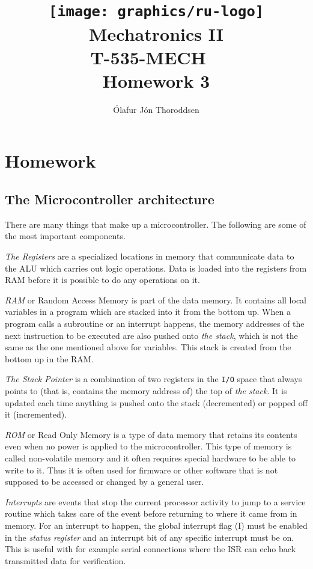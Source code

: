 \documentclass[11pt,a4paper,titlepage]{article}
\author{Ólafur Jón Thoroddsen}  %
\title{\texttt{[image: graphics/ru-logo]}\\\vspace{10mm}
	Mechatronics II\\T-535-MECH \ \\Homework 3}  %
\begin{document}
	\maketitle
	
\section{Homework}

\subsection{The Microcontroller architecture}
\noindent There are many things that make up a microcontroller. The following are some of the most important components.

\textit{The Registers} are a specialized locations in memory that communicate data to the ALU which carries out logic operations. Data is loaded into the registers from RAM before it is possible to do any operations on it.

\textit{RAM} or Random Access Memory is part of the data memory. It contains all local variables in a program which are stacked into it from the bottom up. When a program calls a subroutine or an interrupt happens, the memory addresses of the next instruction to be executed are also pushed onto \textit{the stack}, which is not the same as the one mentioned above for variables. This stack is created from the bottom up in the RAM.

\textit{The Stack Pointer} is a combination of two registers in the \verb|I/O| space that always points to (that is, contains the memory address of) the top of \textit{the stack}. It is updated each time anything is pushed onto the stack (decremented) or popped off it (incremented).

\textit{ROM} or Read Only Memory is a type of data memory that retains its contents even when no power is applied to the microcontroller. This type of memory is called non-volatile memory and it often requires special hardware to be able to write to it. Thus it is often used for firmware or other software that is not supposed to be accessed or changed by a general user.

\textit{Interrupts} are events that stop the current processor activity to jump to a service routine which takes care of the event before returning to where it came from in memory. For an interrupt to happen, the global interrupt flag (I) must be enabled in the \textit{status register} and an interrupt bit of any specific interrupt must be on. This is useful with for example serial connections where the ISR can echo back transmitted data for verification.
\end{document}
